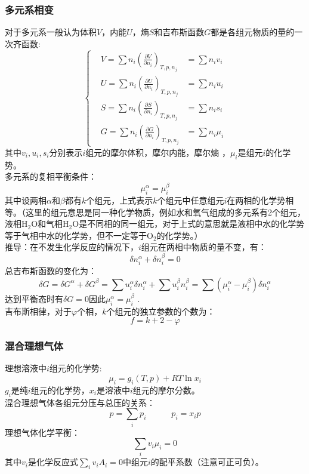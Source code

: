 \documentclass[12pt]{article}
\begin{document}
\subsubsection{多元系相变}
\noindent
对于多元系一般认为体积$V$，内能$U$，熵$S$和吉布斯函数$G$都是各组元物质的量的一次齐函数:
\begin{equation}
	\left\{\begin{split}
		&V=\sum n_i(\frac{\partial V}{\partial n_i})_{T,p,n_j}&=\sum n_i v_i\\
		&U=\sum n_i(\frac{\partial U}{\partial n_i})_{T,p,n_j}&=\sum n_iu_i\\
		&S=\sum n_i (\frac{\partial S}{\partial n_i})_{T,p,n_j}&=\sum n_is_i\\
		&G=\sum n_i (\frac{\partial G}{\partial n_i})_{T,p,n_j}&=\sum n_i\mu_i		
	\end{split}\right.
\end{equation}	
其中$v_i,u_i,s_i$分别表示$i$组元的摩尔体积，摩尔内能，摩尔熵	，$\mu_i$是组元$i$的化学势。\\
多元系的复相平衡条件：
\begin{equation}
	\mu_i^\alpha=\mu_i^\beta
\end{equation}
其中设两相$\alpha$和$\beta$都有$k$个组元，上式表示$k$个组元中任意组元$i$在两相的化学势相等。（这里的组元意思是同一种化学物质，例如水和氧气组成的多元系有2个组元，液相$\mathrm{H_2O}$和气相$\mathrm{H_2O}$是不同相的同一组元，对于上式的意思就是液相中水的化学势等于气相中水的化学势，但不一定等于$\mathrm{O_2}$的化学势。）\\
推导：在不发生化学反应的情况下，$i$组元在两相中物质的量不变，有：
\begin{equation}
	\delta n_i^\alpha+\delta n_i^\beta=0
\end{equation}	
总吉布斯函数的变化为：
\begin{equation}
	\delta G=\delta G^\alpha+\delta G^\beta=\sum u_i^\alpha \delta n_i^\alpha+\sum u_i^\beta n_i^\beta=\sum (\mu_i^\alpha-\mu_i^\beta)\delta n_i^\alpha
\end{equation}
达到平衡态时有$\delta G=0$因此$\mu_i^\alpha=\mu_i^\beta$	.\\

\noindent
吉布斯相律，对于$\varphi$个相，$k$个组元的独立参数的个数为：
\begin{equation}
	f=k+2-\varphi
\end{equation}
\subsubsection{混合理想气体}
\noindent
理想溶液中$i$组元的化学势:
\begin{equation}
	\mu_i=g_i(T,p)+RT\ln x_i
\end{equation}	
$g_i$是纯$i$组元的化学势，$x_i$是溶液中$i$组元的摩尔分数。\\
混合理想气体各组元分压与总压的关系：
\begin{equation}
	p=\underset{i}{\sum}p_i\quad\quad\quad p_i=x_ip 
\end{equation}	
理想气体化学平衡：
\begin{equation}
	\underset{i}{\sum}v_i \mu_i=0
\end{equation}
其中$v_i$是化学反应式$\underset{i}{\sum}v_i A_i=0$中组元$i$的配平系数（注意可正可负）。
\end{document}
